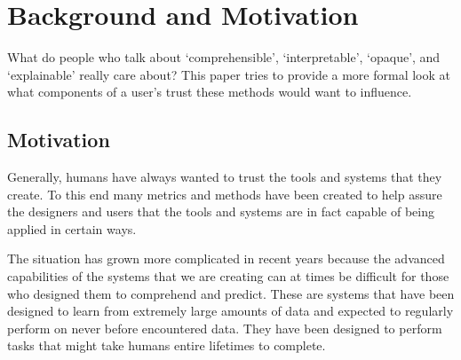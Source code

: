\section{Background and Motivation} \label{sec:background}

What do people who talk about `comprehensible', `interpretable', `opaque', and `explainable' really care about? This paper tries to provide a more formal look at what components of a user's trust these methods would want to influence.

\subsection{Motivation}
    Generally, humans have always wanted to trust the tools and systems that they create. To this end many metrics and methods have been created to help assure the designers and users that the tools and systems are in fact capable of being applied in certain ways.

    The situation has grown more complicated in recent years because the advanced capabilities of the systems that we are creating can at times be difficult for those who designed them to comprehend and predict. These are systems that have been designed to learn from extremely large amounts of data and expected to regularly perform on never before encountered data. They have been designed to perform tasks that might take humans entire lifetimes to complete. 

